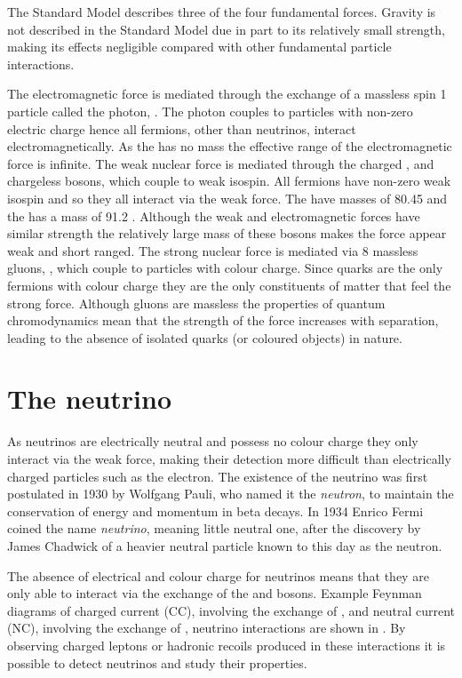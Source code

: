 The Standard Model describes three of the four fundamental forces. Gravity is not described in the Standard Model due in part to its relatively small strength, making its effects negligible compared with other fundamental particle interactions.

The electromagnetic force is mediated through the exchange of a massless spin 1 particle called the photon, \Pphoton. The photon couples to particles with non-zero electric charge hence all fermions, other than neutrinos, interact electromagnetically. As the \Pphoton has no mass the effective range of the electromagnetic force is infinite. The weak nuclear force is mediated through the charged \PWplus, \PWminus and chargeless \PZzero bosons, which couple to weak isospin. All fermions have non-zero weak isospin and so they all interact via the weak force. The \PWpm have masses of 80.45 \GeV and the \PZzero has a mass of 91.2 \GeV. Although the weak and electromagnetic forces have similar strength the relatively large mass of these bosons makes the force appear weak and short ranged. The strong nuclear force is mediated via 8 massless gluons, \Pgluon, which couple to particles with colour charge. Since quarks are the only fermions with colour charge they are the only constituents of matter that feel the strong force. Although gluons are massless the properties of quantum chromodynamics mean that the strength of the force increases with separation, leading to the absence of isolated quarks (or coloured objects) in nature.



\section{The neutrino}
\label{section:particle-physics:neutrino}

As neutrinos are electrically neutral and possess no colour charge they only interact via the weak force, making their detection more difficult than electrically charged particles such as the electron. The existence of the neutrino was first postulated in 1930 by Wolfgang Pauli, who named it the \textit{neutron}, to maintain the conservation of energy and momentum in beta decays. In 1934 Enrico Fermi coined the name \textit{neutrino}, meaning little neutral one, after the discovery by James Chadwick of a heavier neutral particle known to this day as the neutron.

The absence of electrical and colour charge for neutrinos means that they are only able to interact via the exchange of the \PWpm and \PZzero bosons. Example Feynman diagrams of charged current (CC), involving the exchange of \PWpm, and neutral current (NC), involving the exchange of \PZzero, neutrino interactions are shown in . By observing charged leptons or hadronic recoils produced in these interactions it is possible to detect neutrinos and study their properties.

